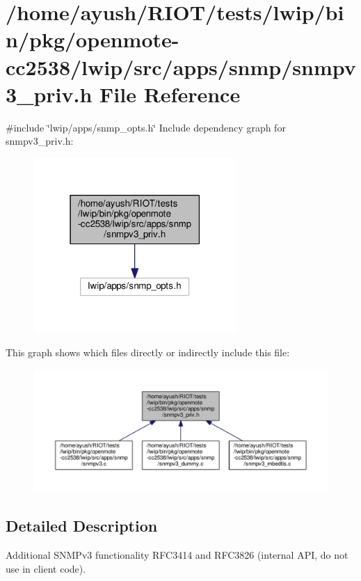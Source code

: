 \hypertarget{openmote-cc2538_2lwip_2src_2apps_2snmp_2snmpv3__priv_8h}{}\section{/home/ayush/\+R\+I\+O\+T/tests/lwip/bin/pkg/openmote-\/cc2538/lwip/src/apps/snmp/snmpv3\+\_\+priv.h File Reference}
\label{openmote-cc2538_2lwip_2src_2apps_2snmp_2snmpv3__priv_8h}
{\ttfamily \#include \char`\"{}lwip/apps/snmp\+\_\+opts.\+h\char`\"{}}\newline
Include dependency graph for snmpv3\+\_\+priv.\+h\+:
\nopagebreak
\begin{figure}[H]
\begin{center}
\leavevmode
\includegraphics[width=219pt]{openmote-cc2538_2lwip_2src_2apps_2snmp_2snmpv3__priv_8h__incl}
\end{center}
\end{figure}
This graph shows which files directly or indirectly include this file\+:
\nopagebreak
\begin{figure}[H]
\begin{center}
\leavevmode
\includegraphics[width=350pt]{openmote-cc2538_2lwip_2src_2apps_2snmp_2snmpv3__priv_8h__dep__incl}
\end{center}
\end{figure}


\subsection{Detailed Description}
Additional S\+N\+M\+Pv3 functionality R\+F\+C3414 and R\+F\+C3826 (internal A\+PI, do not use in client code). 